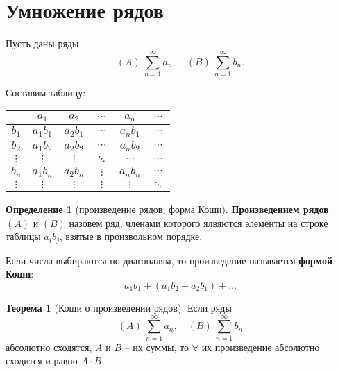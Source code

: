 \documentclass{report}
\theoremstyle{definition}
\newtheorem{definition}{Определение}[section]
\newtheorem{theorem}{Теорема}[section]
\begin{document}
\section{Умножение рядов}

Пусть даны ряды
\begin{equation*}
  (A) \ \sum_{n=1}^{\infty}a_n, \quad (B) \ \sum_{n=1}^{\infty}b_n.
\end{equation*}

Составим таблицу:
\begin{center}
  \begin{tabular}{c | c | c | c | c | c}
             & $a_1$     & $a_2$      & $\cdots$ & $a_n$     & $\cdots$ \\
    \hline
    $b_1$    & $a_1 b_1$ & $a_2 b_1 $ & $\cdots$ & $a_n b_1$ & $\cdots$ \\
    \hline
    $b_2$    & $a_1 b_2$ & $a_2 b_2$  & $\cdots$ & $a_n b_2$ & $\cdots$ \\
    \hline
    $\vdots$ & $\vdots$  & $\vdots$   & $\ddots$ & $\cdots$  & $\cdots$ \\
    \hline
    $b_n$    & $a_1 b_n$ & $a_2 b_n$  & $\vdots$ & $a_n b_n$ & $\cdots$ \\
    \hline
    $\vdots$ & $\vdots$  & $\vdots$   & $\vdots$ & $\vdots$  & $\ddots$ \\
  \end{tabular}
\end{center}

\begin{definition}[произведение рядов, форма Коши]
  \textbf{Произведением рядов} $(A)$ и $(B)$ назовем ряд, членами которого ялвяются элементы на строке таблицы $a_ib_j$, взятые в произвольном порядке.

  Если числа выбираются по диагоналям, то произведение называется \textbf{формой Коши}:
  \begin{equation*}
    a_1 b_1 + (a_1 b_2 + a_2 b_1) + \ldots
  \end{equation*}
\end{definition}

\begin{theorem}[Коши о произведении рядов]
  Если ряды
  \begin{equation*}
    (A) \ \sum_{n=1}^{\infty}a_n, \quad (B) \ \sum_{n=1}^{\infty}b_n
  \end{equation*}
  абсолютно сходятся, $A$ и $B$ -- их суммы, то $\forall$ их произведение абсолютно сходится и равно $A \cdot B$.
\end{theorem}
\end{document}
